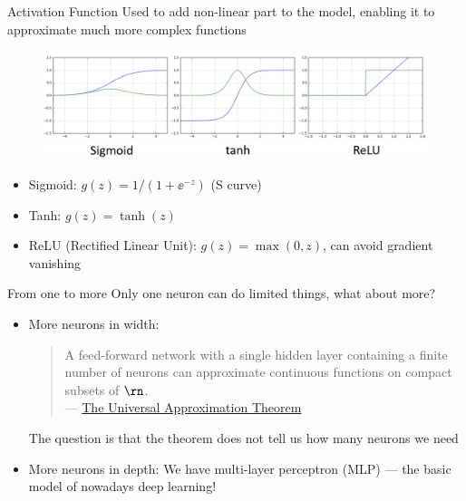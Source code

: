 \documentclass{../TexTemplate/myslide}
\begin{document}
\begin{frame}{Activation Function}
Used to add non-linear part to the model, enabling it to approximate much more complex functions
\begin{figure}
\centering
\includegraphics[width=0.8\linewidth]{fig/activation_function.png}
\end{figure}
\begin{itemize}
	\item Sigmoid: $g(z)=1/(1+\ee^{-z})$ (S curve)
	\item Tanh: $g(z)=\tanh(z)$
	\item ReLU (Rectified Linear Unit): $g(z)=\max(0,z)$, can avoid gradient vanishing
\end{itemize}
\end{frame}

\begin{frame}{From one to more}
Only one neuron can do limited things, what about more?
\begin{itemize}
	\item More neurons in width:
	\begin{quote}
	A feed-forward network with a single hidden layer containing a finite number of neurons can approximate continuous functions on compact subsets of $\rn$.\\
	\hfill --- \href{https://en.wikipedia.org/wiki/Universal_approximation_theorem}{The Universal Approximation Theorem}
	\end{quote}
	The question is that the theorem does not tell us how many neurons we need
	\pause
	\item More neurons in depth: We have multi-layer perceptron (MLP) --- the basic model of nowadays deep learning!
\end{itemize}
\end{frame}
\end{document}
